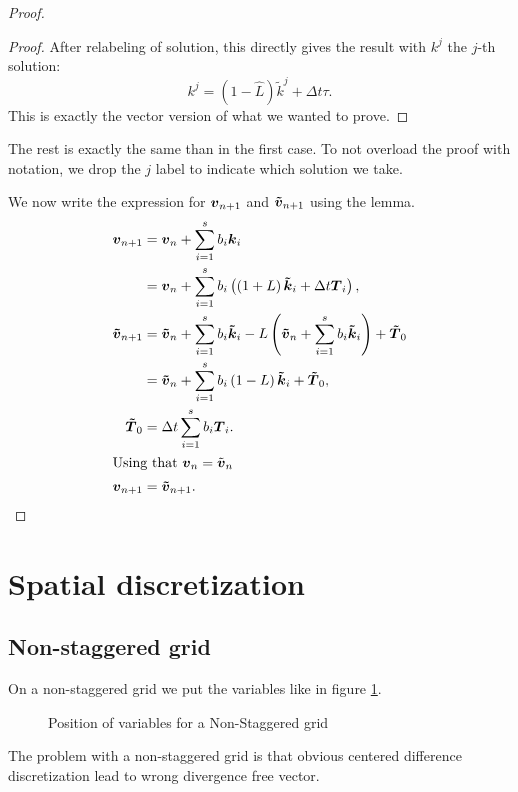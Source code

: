 \begin{proof}
\begin{proof}
After relabeling of solution, this directly gives the result with $k^{j}$ the $j$-th solution:
\begin{equation}
k^{j}=(1-\hat{L})\tilde{k}^{j}+\Delta t \tau.
\end{equation}
This is exactly the vector version of what we wanted to prove.
\end{proof}

The rest is exactly the same than in the first case.
To not overload the proof with notation, we drop the $j$ label to indicate which solution we take.

We now write the expression for ${\boldsymbol {v}}_{n+1}$ and ${\boldsymbol {\tilde{v}}}_{n+1}$ using the lemma.
\begin{align*}
{\boldsymbol {v}}_{n+1}&={\boldsymbol {v}}_{n}+\sum_{i=1}^{s}b_{i}{\boldsymbol {k}}_{i}\\
&={\boldsymbol {v}}_{n}+\sum_{i=1}^{s}b_{i}\left(\left(1+L\right){\boldsymbol {\tilde{k}}}_i+\Delta t {\boldsymbol {T}}_{i}\right),\\
{\boldsymbol {\tilde{v}}}_{n+1}&={\boldsymbol {\tilde{v}}}_{n}+\sum_{i=1}^{s}b_{i}{\boldsymbol {\tilde{k}}}_{i}-L\left({\boldsymbol {\tilde{v}}}_{n}+\sum_{i=1}^{s}b_{i}{\boldsymbol {\tilde{k}}}_{i}\right)+{\boldsymbol {\tilde{T}}}_0\\
&={\boldsymbol {\tilde{v}}}_{n}+\sum_{i=1}^{s}b_{i}\left(1-L\right){\boldsymbol {\tilde{k}}}_{i}+{\boldsymbol {\tilde{T}}}_0,\\
{\boldsymbol {\tilde{T}}}_0&=\Delta t\sum_{i=1}^{s}b_{i}{\boldsymbol {T}}_{i}.\\
\intertext{Using that ${\boldsymbol {v}}_{n}=\tilde{{\boldsymbol {v}}}_{n}$}
{\boldsymbol {v}}_{n+1}&={\boldsymbol {\tilde{v}}}_{n+1}.
\end{align*}

\end{proof}

\section{Spatial discretization}

\subsection{Non-staggered grid}

On a non-staggered grid we put the variables like in figure \ref{fixed:unstaggered}.
\begin{figure}
\caption{Position of variables for a Non-Staggered grid}
\label{fixed:unstaggered}
\end{figure}
The problem with a non-staggered  grid is that obvious centered difference discretization lead to wrong divergence free vector.

